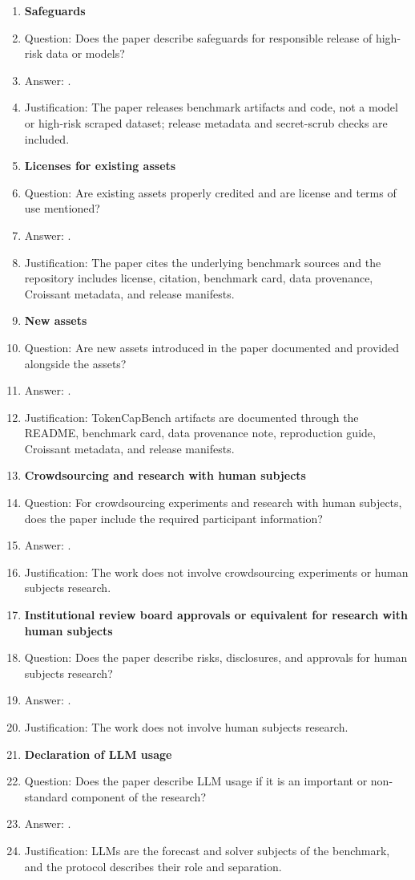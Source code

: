 \begin{enumerate}
\item {\bf Safeguards}
    \item[] Question: Does the paper describe safeguards for responsible release of high-risk data or models?
    \item[] Answer: \answerNA{}.
    \item[] Justification: The paper releases benchmark artifacts and code, not a model or high-risk scraped dataset; release metadata and secret-scrub checks are included.

\item {\bf Licenses for existing assets}
    \item[] Question: Are existing assets properly credited and are license and terms of use mentioned?
    \item[] Answer: \answerYes{}.
    \item[] Justification: The paper cites the underlying benchmark sources and the repository includes license, citation, benchmark card, data provenance, Croissant metadata, and release manifests.

\item {\bf New assets}
    \item[] Question: Are new assets introduced in the paper documented and provided alongside the assets?
    \item[] Answer: \answerYes{}.
    \item[] Justification: TokenCapBench artifacts are documented through the README, benchmark card, data provenance note, reproduction guide, Croissant metadata, and release manifests.

\item {\bf Crowdsourcing and research with human subjects}
    \item[] Question: For crowdsourcing experiments and research with human subjects, does the paper include the required participant information?
    \item[] Answer: \answerNA{}.
    \item[] Justification: The work does not involve crowdsourcing experiments or human subjects research.

\item {\bf Institutional review board approvals or equivalent for research with human subjects}
    \item[] Question: Does the paper describe risks, disclosures, and approvals for human subjects research?
    \item[] Answer: \answerNA{}.
    \item[] Justification: The work does not involve human subjects research.

\item {\bf Declaration of LLM usage}
    \item[] Question: Does the paper describe LLM usage if it is an important or non-standard component of the research?
    \item[] Answer: \answerYes{}.
    \item[] Justification: LLMs are the forecast and solver subjects of the benchmark, and the protocol describes their role and separation.

\end{enumerate}
